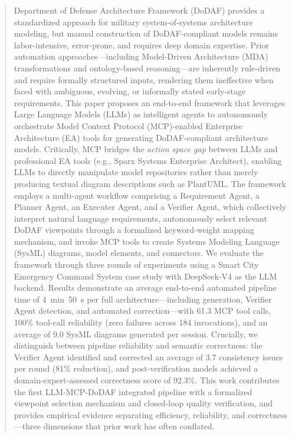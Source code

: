 \documentclass{ieeeaccess}
\begin{document}
\begin{abstract}
Department of Defense Architecture Framework (DoDAF) provides a standardized approach for military system-of-systems architecture modeling, but manual construction of DoDAF-compliant models remains labor-intensive, error-prone, and requires deep domain expertise. Prior automation approaches---including Model-Driven Architecture (MDA) transformations and ontology-based reasoning---are inherently rule-driven and require formally structured inputs, rendering them ineffective when faced with ambiguous, evolving, or informally stated early-stage requirements. This paper proposes an end-to-end framework that leverages Large Language Models (LLMs) as intelligent agents to autonomously orchestrate Model Context Protocol (MCP)-enabled Enterprise Architecture (EA) tools for generating DoDAF-compliant architecture models. Critically, MCP bridges the \emph{action space gap} between LLMs and professional EA tools (e.g., Sparx Systems Enterprise Architect), enabling LLMs to directly manipulate model repositories rather than merely producing textual diagram descriptions such as PlantUML. The framework employs a multi-agent workflow comprising a Requirement Agent, a Planner Agent, an Executer Agent, and a Verifier Agent, which collectively interpret natural language requirements, autonomously select relevant DoDAF viewpoints through a formalized keyword-weight mapping mechanism, and invoke MCP tools to create Systems Modeling Language (SysML) diagrams, model elements, and connectors. We evaluate the framework through three rounds of experiments using a Smart City Emergency Command System case study with DeepSeek-V4 as the LLM backend. Results demonstrate an average end-to-end automated pipeline time of 4~min~50~s per full architecture---including generation, Verifier Agent detection, and automated correction---with 61.3 MCP tool calls, 100\% tool-call reliability (zero failures across 184 invocations), and an average of 9.0 SysML diagrams generated per session. Crucially, we distinguish between pipeline reliability and semantic correctness: the Verifier Agent identified and corrected an average of 3.7 consistency issues per round (81\% reduction), and post-verification models achieved a domain-expert-assessed correctness score of 92.3\%. This work contributes the first LLM-MCP-DoDAF integrated pipeline with a formalized viewpoint selection mechanism and closed-loop quality verification, and provides empirical evidence separating efficiency, reliability, and correctness---three dimensions that prior work has often conflated.
\end{abstract}
\end{document}
